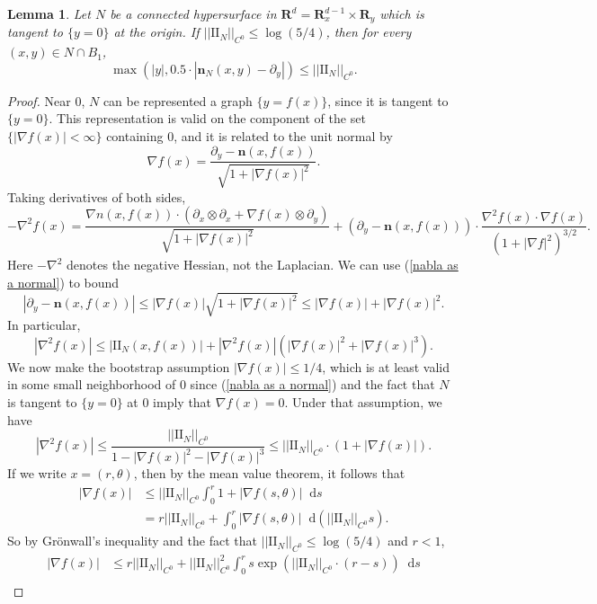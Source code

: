 \documentclass[reqno,11pt]{amsart}
\newcommand{\RR}{\mathbf{R}}
\newcommand*\dif{\mathop{}\!\mathrm{d}}
\newcommand{\Two}{\mathrm{I\!I}}
\newcommand{\normal}{\mathbf n}
\newtheorem{lemma}[theorem]{Lemma}
\theoremstyle{definition}
\numberwithin{equation}{section}
\begin{document}
\begin{lemma}\label{existence of tubes}
	Let $N$ be a connected hypersurface in $\RR^d = \RR^{d - 1}_x \times \RR_y$ which is tangent to $\{y = 0\}$ at the origin.
	If $||\Two_N||_{C^0} \leq \log(5/4)$, then for every $(x, y) \in N \cap B_1$,
	$$\max(|y|, 0.5 \cdot |\normal_N(x, y) - \partial_y|) \leq ||\Two_N||_{C^0}.$$
\end{lemma}
\begin{proof}
	Near $0$, $N$ can be represented a graph $\{y = f(x)\}$, since it is tangent to $\{y = 0\}$.
	This representation is valid on the component of the set $\{|\nabla f(x)| < \infty\}$ containing $0$, and it is related to the unit normal by
\begin{equation}\label{nabla as a normal}
	\nabla f(x) = \frac{\partial_y - \normal(x, f(x))}{\sqrt{1 + |\nabla f(x)|^2}}.
\end{equation}
	Taking derivatives of both sides,
	$$-\nabla^2 f(x) = \frac{\nabla n(x, f(x)) \cdot (\partial_x \otimes \partial_x + \nabla f(x) \otimes \partial_y)}{\sqrt{1 + |\nabla f(x)|^2}} + (\partial_y - \normal(x, f(x))) \cdot \frac{\nabla^2 f(x) \cdot \nabla f(x)}{(1 + |\nabla f|^2)^{3/2}}.$$
	Here $-\nabla^2$ denotes the negative Hessian, not the Laplacian.
	We can use (\ref{nabla as a normal}) to bound
	$$|\partial_y - \normal(x, f(x))| \leq |\nabla f(x)|\sqrt{1 + |\nabla f(x)|^2} \leq |\nabla f(x)| + |\nabla f(x)|^2.$$
	In particular,
	$$|\nabla^2 f(x)| \leq |\Two_N(x, f(x))| + |\nabla^2 f(x)| (|\nabla f(x)|^2 + |\nabla f(x)|^3).$$
	We now make the bootstrap assumption $|\nabla f(x)| \leq 1/4$, which is at least valid in some small neighborhood of $0$ since (\ref{nabla as a normal}) and the fact that $N$ is tangent to $\{y = 0\}$ at $0$ imply that $\nabla f(x) = 0$. Under that assumption, we have
	$$|\nabla^2 f(x)| \leq \frac{||\Two_N||_{C^0}}{1 - |\nabla f(x)|^2 - |\nabla f(x)|^3} \leq ||\Two_N||_{C^0} \cdot (1 + |\nabla f(x)|).$$
	If we write $x = (r, \theta)$, then by the mean value theorem, it follows that
\begin{align*}
	|\nabla f(x)| &\leq ||\Two_N||_{C^0} \int_0^r 1 + |\nabla f(s, \theta)| \dif s \\
	&= r||\Two_N||_{C^0} + \int_0^r |\nabla f(s, \theta)| \dif(||\Two_N||_{C^0} s).
\end{align*}
	So by Gr\"onwall's inequality and the fact that $||\Two_N||_{C^0} \leq \log(5/4)$ and $r < 1$,
\begin{align*}
	|\nabla f(x)| &\leq r ||\Two_N||_{C^0} + ||\Two_N||_{C^0}^2 \int_0^r s \exp(||\Two_N||_{C^0} \cdot (r - s)) \dif s \\

\end{align*}
\end{proof}
\end{document}
